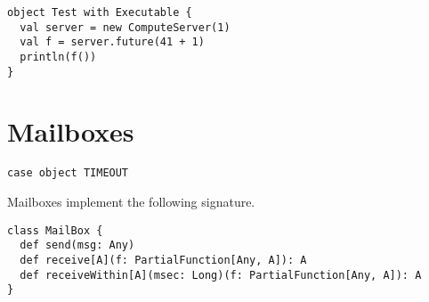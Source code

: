 \begin{itemize}


\begin{lstlisting}
object Test with Executable {
  val server = new ComputeServer(1)
  val f = server.future(41 + 1)
  println(f())
}
\end{lstlisting}

\section{Mailboxes}
\label{sec:mailbox}

\begin{lstlisting}
case object TIMEOUT
\end{lstlisting}
Mailboxes implement the following signature.
\begin{lstlisting}
class MailBox {
  def send(msg: Any)
  def receive[A](f: PartialFunction[Any, A]): A
  def receiveWithin[A](msec: Long)(f: PartialFunction[Any, A]): A
}
\end{lstlisting}


\end{itemize}
